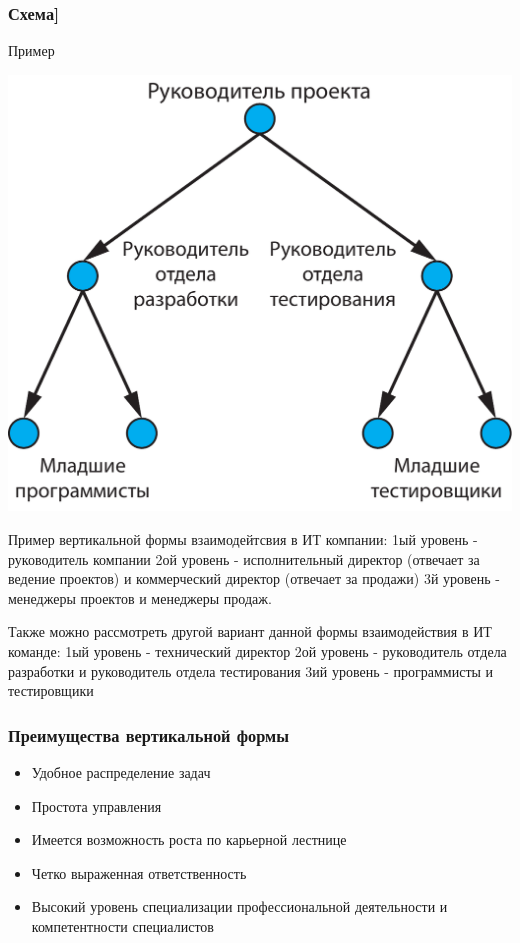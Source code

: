 \documentclass{../industrial-development}
\begin{document}
\begin{frame} \frametitle{Схема]}
	\begin{block}{Пример}
		\centerline{\includegraphics[width=1\textwidth]{vertical.pdf}}
	\end{block}
\end{frame}

\lecturenotes
Пример вертикальной формы взаимодейтсвия в ИТ компании:
1ый уровень - руководитель компании
2ой уровень - исполнительный директор (отвечает за ведение проектов) и коммерческий директор (отвечает за продажи)
3й уровень - менеджеры проектов и менеджеры продаж.

Также можно рассмотреть другой вариант данной формы взаимодействия в ИТ команде:
1ый уровень -  технический директор
2ой уровень -  руководитель отдела разработки и руководитель отдела тестирования
3ий уровень - программисты и тестировщики


\begin{frame} \frametitle{Преимущества вертикальной формы}

  
  \begin{itemize}
  \item Удобное распределение задач
  \item Простота управления
  \item Имеется возможность роста по карьерной лестнице
  \item Четко выраженная ответственность
  \item Высокий уровень специализации профессиональной деятельности и компетентности специалистов

  \end{itemize}
\end{frame}
\end{document}
